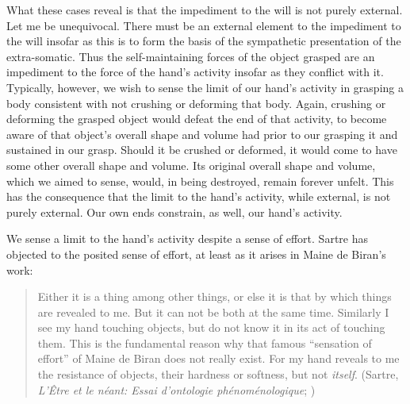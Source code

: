 What these cases reveal is that the impediment to the will is not purely external. Let me be unequivocal. There must be an external element to the impediment to the will insofar as this is to form the basis of the sympathetic presentation of the extra-somatic. Thus the self-maintaining forces of the object grasped are an impediment to the force of the hand's activity insofar as they conflict with it. Typically, however, we wish to sense the limit of our hand's activity in grasping a body consistent with not crushing or deforming that body. Again, crushing or deforming the grasped object would defeat the end of that activity, to become aware of that object's overall shape and volume had prior to our grasping it and sustained in our grasp. Should it be crushed or deformed, it would come to have some other overall shape and volume. Its original overall shape and volume, which we aimed to sense, would, in being destroyed, remain forever unfelt. This has the consequence that the limit to the hand's activity, while external, is not purely external. Our own ends constrain, as well, our hand's activity.

We sense a limit to the hand's activity despite a sense of effort. Sartre has objected to the posited sense of effort, at least as it arises in Maine de Biran's work:
\begin{quote}
	Either it is a thing among other things, or else it is that by which things are revealed to me. But it can not be both at the same time. Similarly I see my hand touching objects, but do not know it in its act of touching them. This is the fundamental reason why that famous ``sensation of effort'' of Maine de Biran does not really exist. For my hand reveals to me the resistance of objects, their hardness or softness, but not \emph{itself}. (Sartre, \emph{L'Être et le néant: Essai d'ontologie phénoménologique}; \citealt[304]{Barnes:1958rt})
\end{quote}

